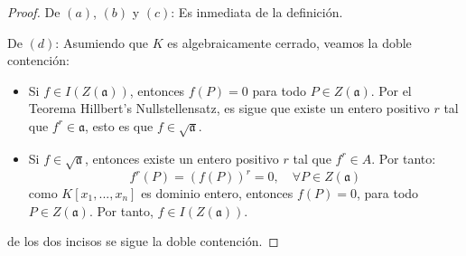 \documentclass[12pt]{report}
\theoremstyle{largebreak}
\newcommand{\fk}[1]{\ensuremath{\mathfrak{#1}}}
\begin{document}
    \begin{proof}
        De $(a)$, $(b)$ y $(c)$: Es inmediata de la definición.

        De $(d)$: Asumiendo que $K$ es algebraicamente cerrado, veamos la doble contención:
        \begin{itemize}
            \item Si $f\in I(Z(\fk{a}))$, entonces $f(P)=0$ para todo $P\in Z(\fk{a})$. Por el Teorema Hillbert's Nullstellensatz, es sigue que existe un entero positivo $r$ tal que $f^r\in\fk{a}$, esto es que $f\in\sqrt{\fk{a}}$.
            \item Si $f\in\sqrt{\fk{a}}$, entonces existe un entero positivo $r$ tal que $f^r\in A$. Por tanto:
            \begin{equation*}
                f^r(P)=\left(f(P)\right)^r=0,\quad\forall P\in Z(\fk{a})
            \end{equation*}
            como $K[x_1,...,x_n]$ es dominio entero, entonces $f(P)=0$, para todo $P\in Z(\fk{a})$. Por tanto, $f\in I(Z(\fk{a}))$.
        \end{itemize}
        de los dos incisos se sigue la doble contención.
        

\end{proof}
\end{document}
